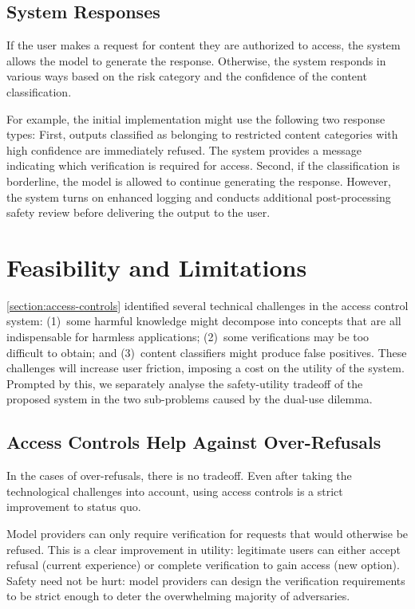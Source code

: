 \documentclass{article}
\theoremstyle{plain}
\theoremstyle{definition}
\theoremstyle{remark}
\begin{document}
\subsection{System Responses} \label{section:system-responses}

If the user makes a request for content they are authorized to access, the system allows the model to generate the response.
Otherwise, the system responds in various ways based on the risk category and the confidence of the content classification.

For example, the initial implementation might use the following two response types:
First, outputs classified as belonging to restricted content categories with high confidence are immediately refused.
The system provides a message indicating which verification is required for access.
Second, if the classification is borderline, the model is allowed to continue generating the response.
However, the system turns on enhanced logging and conducts additional post-processing safety review before delivering the output to the user.

\section{Feasibility and Limitations}
\label{section:feasibility-and-limitations}

\cref{section:access-controls} identified several technical challenges in the access control system: (1)~some harmful knowledge might decompose into concepts that are all indispensable for harmless applications; (2)~some verifications may be too difficult to obtain; and (3)~content classifiers might produce false positives.
These challenges will increase user friction, imposing a cost on the utility of the system.
Prompted by this, we separately analyse the safety-utility tradeoff of the proposed system in the two sub-problems caused by the dual-use dilemma.

\subsection{Access Controls Help Against Over-Refusals}

In the cases of over-refusals, there is no tradeoff.
Even after taking the technological challenges into account, using access controls is a strict improvement to status quo.

Model providers can only require verification for requests that would otherwise be refused.
This is a clear improvement in utility: legitimate users can either accept refusal (current experience) or complete verification to gain access (new option).
Safety need not be hurt: model providers can design the verification requirements to be strict enough to deter the overwhelming majority of adversaries.
\end{document}
